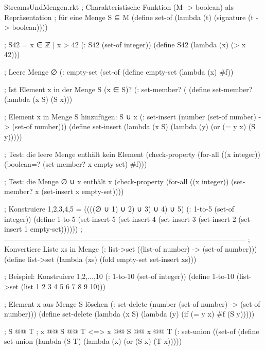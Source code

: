 \begin{filecontents*}{StreamsUndMengen.rkt}
; Charakteristische Funktion (M -> boolean) als Repräsentation 
; für eine Menge S ⊆ M
(define set-of
  (lambda (t)
    (signature (t -> boolean))))

; S42 = { x ∈ ℤ | x > 42 }
(: S42 (set-of integer))
(define S42
  (lambda (x)
    (> x 42))) 

; Leere Menge ∅
(: empty-set (set-of %
(define empty-set
  (lambda (x)
    #f))

; Ist Element x in der Menge S (x ∈ S)?
(: set-member? (%
(define set-member?
  (lambda (x S)
    (S x)))

; Element x in Menge S hinzufügen: S ∪ {x}
(: set-insert (number (set-of number) -> (set-of number)))
(define set-insert
  (lambda (x S)
    (lambda (y)
      (or (= y x)
          (S y)))))

; Test: die leere Menge enthält kein Element
(check-property
 (for-all ((x integer))
   (boolean=? (set-member? x empty-set) #f)))

; Test: die Menge ∅ ∪ {x} enthält x
(check-property
 (for-all ((x integer))
   (set-member? x (set-insert x empty-set))))


; Konstruiere {1,2,3,4,5} = ((((∅ ∪ {1}) ∪ {2}) ∪ {3}) ∪ {4}) ∪ {5})
(: 1-to-5 (set-of integer))
(define 1-to-5
  (set-insert 5
              (set-insert 4
                          (set-insert 3
                                      (set-insert 2
                                                  (set-insert 1 empty-set))))))
;-----------------------------------------------------------------------------------------------------
; Konvertiere Liste xs in Menge
(: list->set ((list-of number) -> (set-of number)))
(define list->set
  (lambda (xs)
    (fold empty-set set-insert xs)))

; Beispiel: Konstruiere {1,2,...,10}
(: 1-to-10 (set-of integer))
(define 1-to-10
  (list->set (list 1 2 3 4 5 6 7 8 9 10)))

; Element x aus Menge S löschen
(: set-delete (number (set-of number) -> (set-of number)))
(define set-delete
  (lambda (x S)
    (lambda (y)
      (if (= y x)
          #f
          (S y)))))

; S @\latexcode{$\cup$}@ T
; x @\latexcode{$\in$}@ S @\latexcode{$\cup$}@ T <=> x @\latexcode{$\in$}@ S @\latexcode{$\lor$}@ x @\latexcode{$\in$}@ T
(: set-union ((set-of %
(define set-union
  (lambda (S T)
    (lambda (x)
      (or (S x) (T x)))))


\end{filecontents*}
